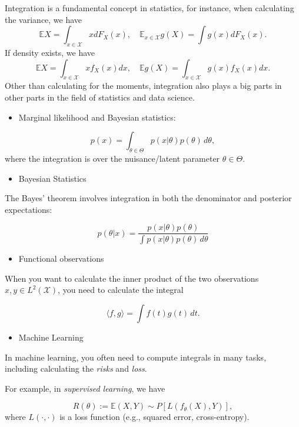 \documentclass[
  letterpaper,
  DIV=11,
  numbers=noendperiod]{scrreprt}
\providecommand{\tightlist}{%
  \setlength{\itemsep}{0pt}\setlength{\parskip}{0pt}}
\begin{document}
Integration is a fundamental concept in statistics, for instance, when
calculating the variance, we have \[
  \mathbb EX = \int_{x\in\mathcal X} x dF_X(x),\quad \mathbb E_{x\in\mathcal X} g(X) = \int g(x) dF_X(x).
\] If density exists, we have \[
\mathbb EX = \int_{x\in\mathcal X} x f_X(x) dx,\quad \mathbb Eg(X) = \int_{x\in\mathcal X} g(x) f_X(x) dx.
\] Other than calculating for the moments, integration also plays a big
parts in other parts in the field of statistics and data science.

\begin{itemize}
\tightlist
\item
  Marginal likelihood and Bayesian statistics:
\end{itemize}

\[
  p(x) = \int_{\theta\in\Theta}     p(x|\theta)p(\theta)\,d\theta,
\] where the integration is over the nuisance/latent parameter
\(\theta\in\Theta\).

\begin{itemize}
\tightlist
\item
  Bayesian Statistics
\end{itemize}

The Bayes' theorem involves integration in both the denominator and
posterior expectations:

\[
p(\theta|x) = \frac{p(x|\theta)p(\theta)}{\int p(x|\theta)p(\theta)\,d\theta}
\]

\begin{itemize}
\tightlist
\item
  Functional observations
\end{itemize}

When you want to calculate the inner product of the two observations
\(x,y\in L^2(\mathcal X)\), you need to calculate the integral

\[
\langle f,g \rangle = \int f(t)g(t)\,dt.
\]

\begin{itemize}
\tightlist
\item
  Machine Learning
\end{itemize}

In machine learning, you often need to compute integrals in many tasks,
including calculating the \emph{risks} and \emph{loss}.

For example, in \emph{supervised learning}, we have

\[R(\theta) := \mathbb E{(X,Y) \sim P}[L(f_\theta(X), Y)],
\] where \(L(\cdot,\cdot)\) is a loss function (e.g., squared error,
cross-entropy).
\end{document}
